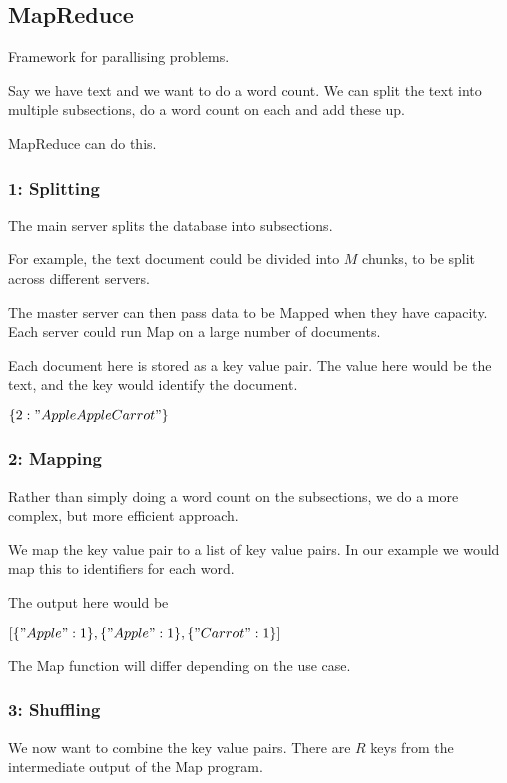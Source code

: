 
\subsection{MapReduce}

Framework for parallising problems.

Say we have text and we want to do a word count. We can split the text into multiple subsections, do a word count on each and add these up.

MapReduce can do this.

\subsubsection{1: Splitting}

The main server splits the database into subsections.

For example, the text document could be divided into \(M\) chunks, to be split across different servers.

The master server can then pass data to be Mapped when they have capacity. Each server could run Map on a large number of documents.

Each document here is stored as a key value pair. The value here would be the text, and the key would identify the document.

\(\{2: "Apple Apple Carrot"\}\)

\subsubsection{2: Mapping}

Rather than simply doing a word count on the subsections, we do a more complex, but more efficient approach.

We map the key value pair to a list of key value pairs. In our example we would map this to identifiers for each word.

The output here would be

\([\{"Apple": 1\}, \{"Apple": 1\}, \{"Carrot": 1\}]\)

The Map function will differ depending on the use case.

\subsubsection{3: Shuffling}

We now want to combine the key value pairs. There are \(R\) keys from the intermediate output of the Map program.

